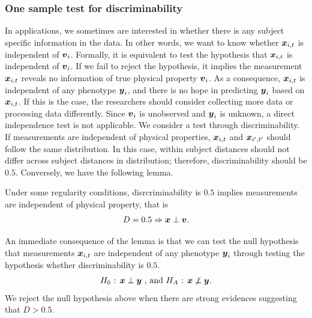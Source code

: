 \documentclass{article}
\begin{document}
\subsubsection{One sample test for discriminability}
In applications, we sometimes are interested in whether there is any subject specific information in the data. In other words, we want to know whether $\boldsymbol{x}_{i,t}$ is independent of $\boldsymbol{v}_i$. Formally, it is equivalent to test the hypothesis that $\boldsymbol{x}_{i,t}$ is independent of $\boldsymbol{v}_i$. If we fail to reject the hypothesis, it implies the measurement $\boldsymbol{x}_{i,t}$ reveals no information of true physical property $\boldsymbol{v}_i$. As a consequence, $\boldsymbol{x}_{i,t}$ is independent of any phenotype $\boldsymbol{y}_i$, and there is no hope in predicting $\boldsymbol{y}_i$ based on $\boldsymbol{x}_{i,t}$. If this is the case, the researchers should consider collecting more data or processing data differently. Since $\boldsymbol{v}_i$ is unobserved and $\boldsymbol{y}_i$ is unknown, a direct independence test is not applicable. We consider a test through discriminability. If measurements are independent of physical properties, $\boldsymbol{x}_{i,t}$ and $\boldsymbol{x}_{i',t'}$ should follow the same distribution. In this case, within subject distances should not differ across subject distances in distribution; therefore, discriminability should be $0.5$. Conversely, we have the following lemma.
\begin{lem}	
	Under some regularity conditions, disrcriminability is $0.5$ implies measurements are independent of physical property, that is 
	\[D=0.5 \Rightarrow \boldsymbol{x} \perp \boldsymbol{v}  .  \]
	\label{lem:lem3}
\end{lem}
An immediate consequence of the lemma is that we can test the null hypothesis that measurements $\boldsymbol{x}_{i,t}$ are independent of any phenotype $\boldsymbol{y}_i$ through testing the hypothesis whether discriminability is $0.5$.
\[ H_0 \text{ : } \boldsymbol{x} \perp \boldsymbol{y} \text{ , and } H_A \text{ : } \boldsymbol{x} \not\perp \boldsymbol{y} . \]
We reject the null hypothesis above when there are strong evidences suggesting that $D > 0.5$.
\end{document}
